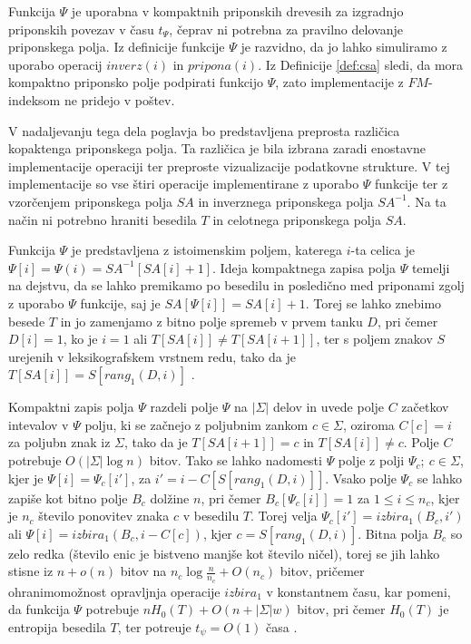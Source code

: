 Funkcija $\Psi$ je uporabna v kompaktnih priponskih drevesih za izgradnjo priponskih povezav v času $t_\Psi$, čeprav ni potrebna za pravilno delovanje priponskega polja. Iz definicije funkcije $\Psi$ je razvidno, da jo lahko simuliramo z uporabo operacij $inverz(i)$ in $pripona(i)$. Iz Definicije \ref{def:csa} sledi, da mora kompaktno priponsko polje podpirati funkcijo $\Psi$, zato implementacije z $FM$-indeksom ne pridejo v poštev. 

V nadaljevanju tega dela poglavja bo predstavljena preprosta različica kopaktenga priponskega polja. Ta različica je bila izbrana zaradi enostavne implementacije operaciji ter preproste vizualizacije podatkovne strukture. V tej implementacije so vse štiri operacije implementirane z uporabo $\Psi$ funkcije ter z vzorčenjem priponskega polja $SA$ in inverznega priponskega polja $SA^{-1}$. Na ta način ni potrebno hraniti besedila $T$ in celotnega priponskega polja $SA$.

Funkcija $\Psi$ je predstavljena z istoimenskim poljem, katerega $i$-ta celica je $\Psi[i]=\Psi(i)=SA^{-1}[SA[i]+1]$. Ideja kompaktnega zapisa polja $\Psi$ temelji na dejstvu, da se lahko premikamo po besedilu in posledično med priponami zgolj z uporabo $\Psi$ funkcije, saj je $SA[\Psi[i]]=SA[i]+1$. Torej se lahko znebimo besede $T$ in jo zamenjamo z bitno polje spremeb v prvem tanku $D$, pri čemer $D[i]=1$, ko je $i=1$ ali $T[SA[i]]\ne T[SA[i+1]]$, ter s poljem znakov $S$ urejenih v leksikografskem vrstnem redu, tako da je $T[SA[i]]=S[rang_1(D,i)]$ \cite{Navarro2016}.

Kompaktni zapis polja $\Psi$ razdeli polje $\Psi$ na $|\Sigma|$ delov in uvede polje $C$ začetkov intevalov v $\Psi$ polju, ki se začnejo z poljubnim zankom $c\in\Sigma$, oziroma $C[c]=i$ za poljubn znak iz $\Sigma$, tako da je $T[SA[i+1]]=c$ in $T[SA[i]]\ne c$. Polje $C$ potrebuje $O(|\Sigma|\log{n})$ bitov. Tako se lahko nadomesti $\Psi$ polje z polji $\Psi_c;\:c\in\Sigma$, kjer je $\Psi[i]=\Psi_c[i']$,  za $i'=i-C[S[rang_1(D,i)]]$. Vsako polje $\Psi_c$ se lahko zapiše kot bitno polje $B_c$ dolžine $n$, pri čemer $B_c[\Psi_c[i]]=1$ za $1 \le i \le n_c$, kjer je $n_c$ število ponovitev znaka $c$ v besedilu $T$. Torej velja $\Psi_c[i']=izbira_1(B_c,i')$ ali $\Psi[i]=izbira_1(B_c,i-C[c])$, kjer $c=S[rang_1(D,i)]$. Bitna polja $B_c$ so zelo redka (število enic je bistveno manjše kot število ničel), torej se jih lahko stisne iz $n+o(n)$ bitov na $n_c\log\frac{n}{n_c}+O(n_c)$ bitov, pričemer ohranimomožnost opravljnja operacije $\textit{izbira}_1$ v konstantnem času, kar pomeni, da funkcija $\Psi$ potrebuje $nH_0(T)+O(n+|\Sigma|w)$ bitov, pri čemer $H_0(T)$ je entropija besedila $T$, ter potreuje $t_\psi=O(1)$ časa \cite{Navarro2016}.

